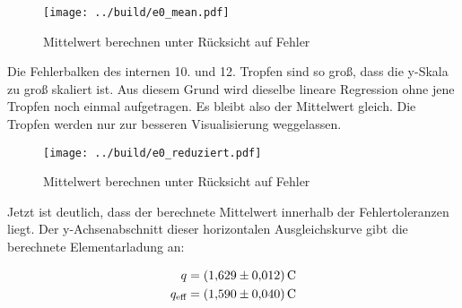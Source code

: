 \begin{figure*}
    \texttt{[image: ../build/e0\_mean.pdf]}
    \caption{Mittelwert berechnen unter Rücksicht auf Fehler}
\end{figure*}

\noindent Die Fehlerbalken des internen 10. und 12. Tropfen sind so groß, dass die y-Skala zu groß skaliert ist. Aus diesem Grund wird 
dieselbe lineare Regression ohne jene Tropfen noch einmal aufgetragen. Es bleibt also der Mittelwert gleich. Die Tropfen werden nur zur 
besseren Visualisierung weggelassen.

\begin{figure*}
    \texttt{[image: ../build/e0\_reduziert.pdf]}
    \caption{Mittelwert berechnen unter Rücksicht auf Fehler}
\end{figure*}

\noindent Jetzt ist deutlich, dass der berechnete Mittelwert innerhalb der Fehlertoleranzen liegt. Der y-Achsenabschnitt dieser horizontalen 
Ausgleichskurve gibt die berechnete Elementarladung an:

\begin{align*}
    q            &= \qty{1.629\pm0.012}{\coulomb} \\
    q_\text{eff} &= \qty{1.590 \pm0.040}{\coulomb} 
\end{align*}




